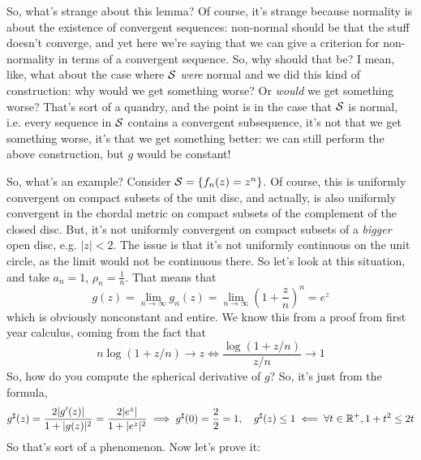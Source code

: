 \documentclass{article}
\begin{document}
So, what's strange about this lemma? Of course, it's strange because normality is about the existence of convergent sequences: non-normal should be that the stuff doesn't converge, and yet here we're saying that we can give a criterion for non-normality in terms of a convergent sequence. So, why should that be? I mean, like, what about the case where \(\mathcal{S}\) \textit{were} normal and we did this kind of construction: why would we get something worse? Or \textit{would} we get something worse?
That's sort of a quandry, and the point is in the case that \(\mathcal{S}\) is normal, i.e. every sequence in \(\mathcal{S}\) contains a convergent subsequence, it's not that we get something worse, it's that we get something better: we can still perform the above construction, but \(g\) would be constant!

So, what's an example? Consider \(\mathcal{S} = \{f_n(z) = z^n\}\). Of course, this is uniformly convergent on compact subsets of the unit disc, and actually, is also uniformly convergent in the chordal metric on compact subsets of the complement of the closed disc. But, it's not uniformly convergent on compact subsets of a \textit{bigger} open disc, e.g. \(|z| < 2\). The issue is that it's not uniformly continuous on the unit circle, as the limit would not be continuous there. So let's look at this situation, and take \(a_n = 1\), \(\rho_n = \frac{1}{n}\). That means that
\begin{equation}g(z) = \lim_{n \to \infty}g_n(z) = \lim_{n \to \infty}\left(1 + \frac{z}{n}\right)^n = e^z\end{equation}
which is obviously nonconstant and entire. We know this from a proof from first year calculus, coming from the fact that
\begin{equation}n\log(1 + z/n) \to z \iff \frac{\log(1 + z/n)}{z/n} \to 1\end{equation}
So, how do you compute the spherical derivative of \(g\)? So, it's just from the formula,
\begin{equation}g^\sharp(z) = \frac{2|g'(z)|}{1 + |g(z)|^2} = \frac{2|e^z|}{1 + |e^z|^2} \implies g^\sharp(0) = \frac{2}{2} = 1, \quad g^\sharp(z) \leq 1 \impliedby \forall t \in \mathbb{R}^+, 1 + t^2 \leq 2t\end{equation}
So that's sort of a phenomenon. Now let's prove it:
\end{document}
